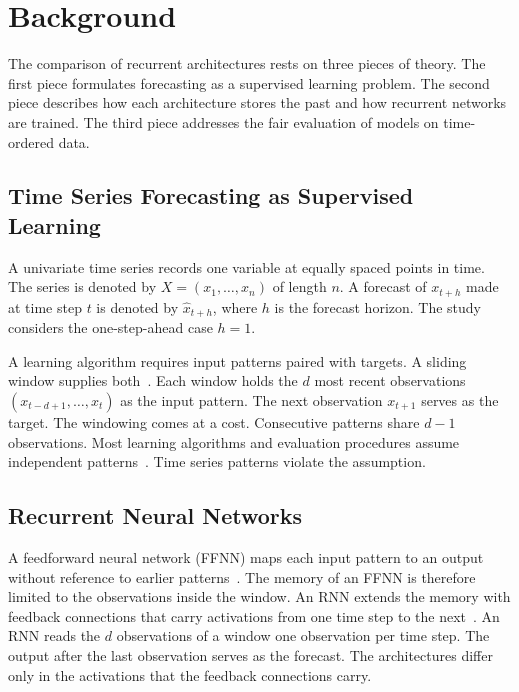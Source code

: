 \documentclass[conference,10pt]{IEEEtran}
\begin{document}
\section{Background}
\label{sec:background}
The comparison of recurrent architectures rests on three pieces of
theory.
The first piece formulates forecasting as a supervised learning problem.
The second piece describes how each architecture stores the past and how
recurrent networks are trained.
The third piece addresses the fair evaluation of models on
time-ordered data.

\subsection{Time Series Forecasting as Supervised Learning}

A univariate time series records one variable at equally spaced points
in time.
The series is denoted by $X = (x_1, \ldots, x_n)$ of length $n$.
A forecast of $x_{t+h}$ made at time step $t$ is denoted by
$\hat{x}_{t+h}$, where $h$ is the forecast horizon.
The study considers the one-step-ahead case $h = 1$.

A learning algorithm requires input patterns paired with targets.
A sliding window supplies both~\cite{hyndman2021}.
Each window holds the $d$ most recent observations
$(x_{t-d+1}, \ldots, x_t)$ as the input pattern.
The next observation $x_{t+1}$ serves as the target.
The windowing comes at a cost.
Consecutive patterns share $d-1$ observations.
Most learning algorithms and evaluation procedures assume independent
patterns~\cite{bergmeir2012}.
Time series patterns violate the assumption.

\subsection{Recurrent Neural Networks}

A feedforward neural network (FFNN) maps each input pattern to an output
without reference to earlier patterns~\cite{engelbrecht2007}.
The memory of an FFNN is therefore limited to the observations inside
the window.
An RNN extends the memory with feedback connections that carry
activations from one time step to the next~\cite{elman1990}.
An RNN reads the $d$ observations of a window one observation per time
step.
The output after the last observation serves as the forecast.
The architectures differ only in the activations that the feedback
connections carry.
\end{document}
